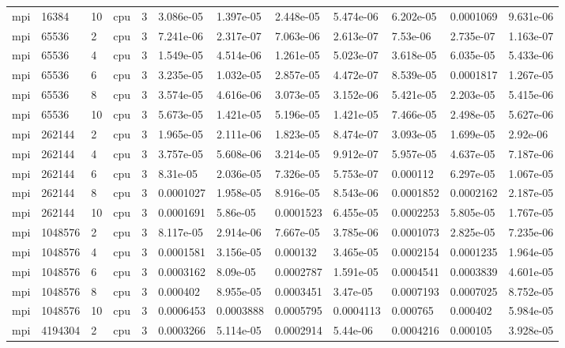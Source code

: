 \begin{tabular}{llllllllllll}
mpi & 16384 & 10 & cpu & 3 & 3.086e-05 & 1.397e-05 & 2.448e-05 & 5.474e-06 & 6.202e-05 & 0.0001069 & 9.631e-06 \\
mpi & 65536 & 2 & cpu & 3 & 7.241e-06 & 2.317e-07 & 7.063e-06 & 2.613e-07 & 7.53e-06 & 2.735e-07 & 1.163e-07 \\
mpi & 65536 & 4 & cpu & 3 & 1.549e-05 & 4.514e-06 & 1.261e-05 & 5.023e-07 & 3.618e-05 & 6.035e-05 & 5.433e-06 \\
mpi & 65536 & 6 & cpu & 3 & 3.235e-05 & 1.032e-05 & 2.857e-05 & 4.472e-07 & 8.539e-05 & 0.0001817 & 1.267e-05 \\
mpi & 65536 & 8 & cpu & 3 & 3.574e-05 & 4.616e-06 & 3.073e-05 & 3.152e-06 & 5.421e-05 & 2.203e-05 & 5.415e-06 \\
mpi & 65536 & 10 & cpu & 3 & 5.673e-05 & 1.421e-05 & 5.196e-05 & 1.421e-05 & 7.466e-05 & 2.498e-05 & 5.627e-06 \\
mpi & 262144 & 2 & cpu & 3 & 1.965e-05 & 2.111e-06 & 1.823e-05 & 8.474e-07 & 3.093e-05 & 1.699e-05 & 2.92e-06 \\
mpi & 262144 & 4 & cpu & 3 & 3.757e-05 & 5.608e-06 & 3.214e-05 & 9.912e-07 & 5.957e-05 & 4.637e-05 & 7.187e-06 \\
mpi & 262144 & 6 & cpu & 3 & 8.31e-05 & 2.036e-05 & 7.326e-05 & 5.753e-07 & 0.000112 & 6.297e-05 & 1.067e-05 \\
mpi & 262144 & 8 & cpu & 3 & 0.0001027 & 1.958e-05 & 8.916e-05 & 8.543e-06 & 0.0001852 & 0.0002162 & 2.187e-05 \\
mpi & 262144 & 10 & cpu & 3 & 0.0001691 & 5.86e-05 & 0.0001523 & 6.455e-05 & 0.0002253 & 5.805e-05 & 1.767e-05 \\
mpi & 1048576 & 2 & cpu & 3 & 8.117e-05 & 2.914e-06 & 7.667e-05 & 3.785e-06 & 0.0001073 & 2.825e-05 & 7.235e-06 \\
mpi & 1048576 & 4 & cpu & 3 & 0.0001581 & 3.156e-05 & 0.000132 & 3.465e-05 & 0.0002154 & 0.0001235 & 1.964e-05 \\
mpi & 1048576 & 6 & cpu & 3 & 0.0003162 & 8.09e-05 & 0.0002787 & 1.591e-05 & 0.0004541 & 0.0003839 & 4.601e-05 \\
mpi & 1048576 & 8 & cpu & 3 & 0.000402 & 8.955e-05 & 0.0003451 & 3.47e-05 & 0.0007193 & 0.0007025 & 8.752e-05 \\
mpi & 1048576 & 10 & cpu & 3 & 0.0006453 & 0.0003888 & 0.0005795 & 0.0004113 & 0.000765 & 0.000402 & 5.984e-05 \\
mpi & 4194304 & 2 & cpu & 3 & 0.0003266 & 5.114e-05 & 0.0002914 & 5.44e-06 & 0.0004216 & 0.000105 & 3.928e-05 \\

\end{tabular}
